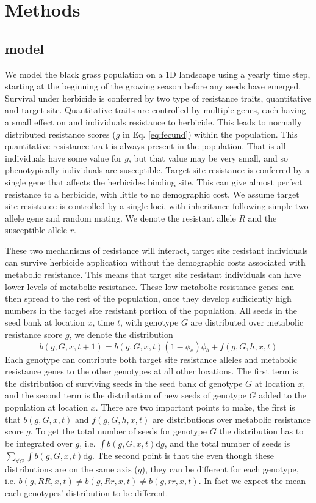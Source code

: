 \documentclass[12pt, a4paper]{article}
\begin{document}
\section{Methods}
\subsection{model}
We model the black grass population on a 1D landscape using a yearly time step, starting at the beginning of the growing season before any seeds have emerged. Survival under herbicide is conferred by two type of resistance traits, quantitative and target site. Quantitative traits are controlled by multiple genes, each having a small effect on and individuals resistance to herbicide. This leads to normally distributed resistance scores ($g$ in Eq. \ref{eq:fecund}) within the population. This quantitative resistance trait is always present in the population. That is all individuals have some value for $g$, but that value may be very small, and so phenotypically individuals are susceptible. Target site resistance is conferred by a single gene that affects the herbicides binding site. This can give almost perfect resistance to a herbicide, with little to no demographic cost. We assume target site resistance is controlled by a single loci, with inheritance following simple two allele gene and random mating. We denote the resistant allele $R$ and the susceptible allele $r$. 

These two mechanisms of resistance will interact, target site resistant individuals can survive herbicide application without the demographic costs associated with metabolic resistance. This means that target site resistant individuals can have lower levels of metabolic resistance. These low metabolic resistance genes can then spread to the rest of the population, once they develop sufficiently high numbers in the target site resistant portion of the population. All seeds in the seed bank  at location $x$, time $t$, with genotype $G$ are distributed over metabolic resistance score $g$, we denote the distribution  
\begin{equation}\label{eq:seedbank_simp}
	b(g, G, x, t + 1) = b(g, G, x, t)(1 - \phi_e)\phi_b + f(g, G, h, x, t) 
\end{equation}
Each genotype can contribute both target site resistance alleles and metabolic resistance genes to the other genotypes at all other locations. The first term is the distribution of surviving seeds in the seed bank of genotype $G$ at location $x$, and the second term is the distribution of new seeds of genotype $G$ added to the population at location $x$. There are two important points to make, the first is that $b(g, G, x, t)$ and $f(g, G, h, x, t)$ are distributions over metabolic resistance score $g$. To get the total number of seeds for genotype $G$ the distribution has to be integrated over $g$, i.e. $\int b(g, G, x, t) \text{d}g$, and the total number of seeds is $\sum_{\forall G} \int b(g, G, x, t) \text{d}g$. The second point is that the even though these distributions are on the same axis ($g$), they can be different for each genotype, i.e. $b(g, RR, x, t) \neq b(g, Rr, x, t) \neq b(g, rr, x, t)$. In fact we expect the mean each genotypes' distribution to be different. 
\end{document}
